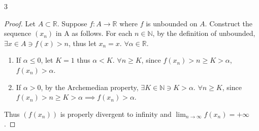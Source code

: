 \documentclass{article}
\newcommand{\R}{\mathbb{R}}
\newcommand{\N}{\mathbb{N}}
\begin{document}
\begin{PROB}{3}\label{Problem 3.}
\end{PROB}
\begin{proof}
    Let $A \subset \R$. Suppose $f: A \to \R$ where $f$ is unbounded on $A$. Construct the sequence $(x_n)$ in A as follows. For each $n \in \N$, by the definition of unbounded, $\exists x \in A \ni f(x) > n$, thus let $x_n = x$. $\forall \alpha \in \R$.
    
    \begin{enumerate}
        \item If $\alpha \leq 0$, let $K = 1$ thus $\alpha < K$. $\forall n \geq K$, since $f(x_n) > n \geq K > \alpha$, $f(x_n) > \alpha$. 
        \item If $\alpha > 0$, by the Archemedian property, $\exists K \in \N \ni K > \alpha$. $\forall n \geq K$, since $f(x_n) > n \geq K > \alpha \implies f(x_n) > \alpha$.               
    \end{enumerate}

    Thus $(f(x_n))$ is properly divergent to infinity and $\lim_{n \to \infty} f(x_n) = + \infty$.  
    
\end{proof}
\end{document}
